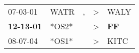 \begin{supertabular}{p{0.07\textwidth}p{0.06\textwidth}p{0.02\textwidth}p{0.02\textwidth}p{0.06\textwidth}}
          07-03-01\textsuperscript{} &  WATR\textsuperscript{} &  , &  \textgreater &         WALY\textsuperscript{} \\
 \textbf{12-13-01\textsuperscript{}} &                   *OS2* &    &  \textgreater &  \textbf{FF\textsuperscript{}} \\
          08-07-04\textsuperscript{} &                   *OS1* &    &  \textgreater &         KITC\textsuperscript{} \\
\end{supertabular}
